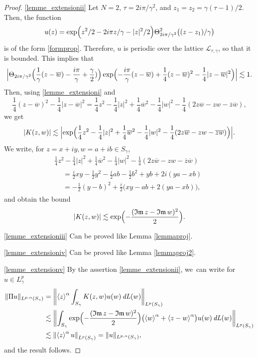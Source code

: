 \documentclass[10pt]{amsart}
\DeclareMathOperator{\dL}{\mathit{dL}}
\theoremstyle{definition}
\let\EE\exp
\let\ov\overline
\newcommand{\Bpa}[1]{\Bigl(#1\Bigr)}
\newcommand{\bra}[1]{\left\langle #1 \right\rangle}
\newcommand{\abs}[1]{\left|#1\right|}
\newcommand{\Babs}[1]{\Bigl|#1\Bigr|}
\newcommand{\absabs}[1]{\left\|#1\right\|}
\newcommand{\bbabsabs}[1]{\biggl\|#1\biggr\|}
\begin{document}
\begin{proof}
\eqref{lemme_extensionii}
Let $N=2$, $\tau = {2i\pi}/{\gamma^2}$, and $z_1 = z_2 = {\gamma}(\tau-1)/2$. Then, the function
\[
u(z) = \EE\Bigl({z^2/2-{2i\pi}z/ {\gamma}-|z|^2/2}\Bigr) \Theta^2_{{2i\pi}/{\gamma^2}}\bigl((z-z_1)/\gamma\bigr) 
\]
is of the form \eqref{formprop}. Therefore, $u$ is periodic over the lattice $\mathcal{L}_{\tau,\gamma}$, so that it is bounded. This implies that
\[
\Babs{\Theta_{{2i\pi}/{\gamma^2}}\Bpa{\frac{1}{\gamma}(z-\ov{w})-\frac{i\pi}{\gamma}+\frac{\gamma}{2})}\EE \Bigl({-\frac{i\pi}{\gamma}(z-\ov{w})+\frac14(z-\ov{w})^2-\frac14|z-\ov{w}|^2} \Bigr)} \lesssim 1.
\]
Then, using \eqref{lemme_extensioni} and
\[
\frac14(z-\ov{w})^2-\frac14|z-\ov{w}|^2 = \frac14z^2-\frac14|z|^2+\frac14\ov{w}^2-\frac14|w|^2-\frac14(2z\ov{w}-zw-\ov{z}\ov{w}), 
\]
we get
\[
\abs{K(z,w)} \lesssim \Babs{\EE \Bigl(\frac14z^2-\frac14|z|^2+\frac14\ov{w}^2-\frac14|w|^2-\frac14(2z\ov{w}-zw-\ov{z}\ov{w}) \Bigr)}.
\]
We write, for $z=x+iy, w=a+ib \in S_{\gamma}$,
\begin{multline*}
\frac14z^2-\frac14|z|^2+\frac14\ov{w}^2-\frac14|w|^2-\frac14(2z\ov{w}-zw-\ov{z}\ov{w})\\
\begin{aligned}
& = \frac{i}{2}xy-\frac12y^2-\frac{i}{2}ab-\frac{1}{2}b^2 + yb +2i(ya-xb) \\
& = -\frac12(y-b)^2 + \frac{i}2\bigl(xy-ab+2(ya-xb)\bigr),
\end{aligned}
\end{multline*}
and obtain the bound
\[
\abs{K(z,w)} \lesssim \EE\Bigl(-\frac{(\Im z-\Im w)^2}2\Bigr).
\]

\eqref{lemme_extensioniii} Can be proved like Lemma \ref{lemmaproj}.

\eqref{lemme_extensioniv} Can be proved like Lemma \ref{lemmaproj2}.

\eqref{lemme_extensionv} By the assertion \eqref{lemme_extensionii}, we~can write for $u\in L^p_{\gamma}$
\begin{align*}
\|\Pi u\|_{L^{p,\alpha}(S_{\gamma})} &= \bbabsabs{\bra{z}^\alpha\int_{S_{\gamma}}K(z,w)u(w)\dL(w)}_{L^p(S_{\gamma})}\\
& \lesssim \bbabsabs{\int_{S_{\gamma}} \EE\Bigl(-\frac{(\Im z-\Im w)^2}2\Bigr) \bigl(\bra{w}^\alpha+\bra{z-w}^\alpha\bigr)u(w)\dL(w)}_{L^p(S_{\gamma})} \\
& \lesssim \absabs{\bra{z}^\alpha u}_{L^p(S_{\gamma})} = \|u\|_{L^{p,\alpha}(S_{\gamma})},
\end{align*}
and the result follows.
\end{proof}
\end{document}
